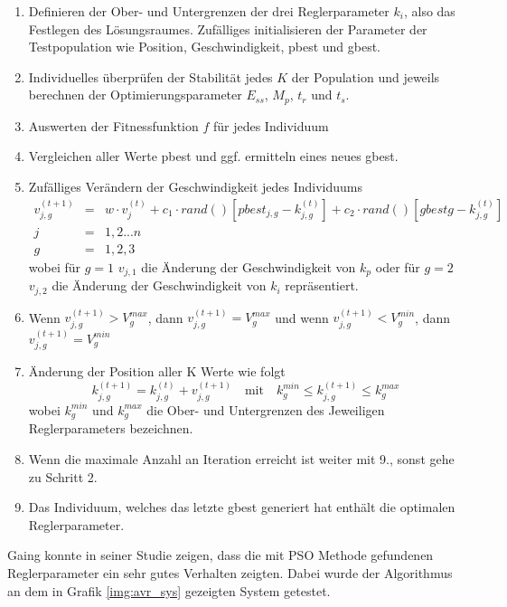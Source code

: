 \begin{enumerate}
    \item Definieren der Ober- und Untergrenzen der drei Reglerparameter $k_i$, also das Festlegen des L\"osungsraumes. Zuf\"alliges initialisieren der Parameter der Testpopulation wie Position, Geschwindigkeit, pbest und gbest.
    \item Individuelles \"uberpr\"ufen der Stabilit\"at jedes $K$ der Population und jeweils berechnen der Optimierungsparameter $E_{ss}$, $M_p$, $t_r$ und $t_s$.
    \item Auswerten der Fitnessfunktion $f$ f\"ur jedes Individuum
    \item Vergleichen aller Werte pbest und ggf. ermitteln eines neues gbest.
    \item Zuf\"alliges Ver\"andern der Geschwindigkeit jedes Individuums
        \begin{eqnarray}
            v_{j,g}^{(t+1)}&=&w\cdot v_j^{(t)}+c_1\cdot rand() [pbest_{j,g}-k^{(t)}_{j,g}]+c_2\cdot rand() [gbest{g}-k^{(t)}_{j,g}] \nonumber\\
            j&=&1,2...n\nonumber\\
            g&=&1,2,3\nonumber
        \end{eqnarray}
        wobei f\"ur $g=1$ $v_{j,1}$ die \"Anderung der Geschwindigkeit von $k_p$ oder f\"ur $g=2$ $v_{j,2}$ die \"Anderung der Geschwindigkeit von $k_i$ repr\"asentiert.
    \item Wenn $v_{j,g}^{(t+1)}>V_g^{max}$, dann $v_{j,g}^{(t+1)}=V_g^{max}$ und wenn $v_{j,g}^{(t+1)}<V_g^{min}$, dann $v_{j,g}^{(t+1)}=V_g^{min}$
    \item \"Anderung der Position aller K Werte wie folgt
        \begin{equation}
            k^{(t+1)}_{j,g}=k^{(t)}_{j,g}+v_{j,g}^{(t+1)}\quad \textrm{mit}\quad k^{min}_{g} \leq k^{(t+1)}_{j,g} \leq k^{max}_{g}
        \end{equation}
        wobei $k^{min}_{g}$ und $k^{max}_{g}$ die Ober- und Untergrenzen des Jeweiligen Reglerparameters bezeichnen.
    \item Wenn die maximale Anzahl an Iteration erreicht ist weiter mit 9., sonst gehe zu Schritt 2.
    \item Das Individuum, welches das letzte gbest generiert hat enth\"alt die optimalen Reglerparameter.
\end{enumerate}

Gaing konnte in seiner Studie zeigen, dass die mit PSO Methode gefundenen Reglerparameter ein sehr gutes Verhalten zeigten. Dabei wurde der Algorithmus an dem in Grafik \ref{img:avr_sys} gezeigten System getestet.

